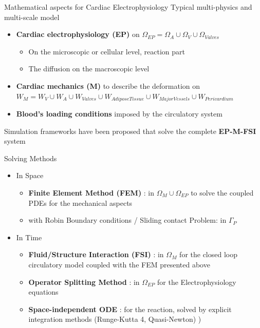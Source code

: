 \documentclass{beamer}
\begin{document}
\begin{frame}{Mathematical aspects for Cardiac Electrophysiology \cite{gerach2021electro}}
  Typical multi-physics and multi-scale model 
  \begin{itemize}
    \item \textbf{Cardiac electrophysiology (EP)} on $\Omega_{EP} = \Omega_A \cup \Omega_V \cup \Omega_{Valves}$
    \begin{itemize}
      \item On the microscopic or cellular level, reaction part
      \item The diffusion on the macroscopic level
    \end{itemize}
    \item \textbf{Cardiac mechanics (M)} to describe the deformation on $W_M = W_V \cup W_A \cup W_{Valves} \cup W_{AdiposeTissue} \cup W_{MajorVessels} \cup W_{Pericardium}$
    \item \textbf{Blood's loading conditions} imposed by the circulatory system
  \end{itemize}
  Simulation frameworks have been proposed that solve the complete \textbf{EP-M-FSI} system
\end{frame}

\begin{frame}{Solving Methods \cite{gerach2021electro}}
  \begin{itemize}
    \item In Space
      \begin{itemize}
        \item \textbf{Finite Element Method (FEM)} : in $\Omega_{M} \cup \Omega_{EP}$ to solve the coupled PDEs for the mechanical aspects
        \item with Robin Boundary conditions / Sliding contact Problem: in $\Gamma_{P}$
      \end{itemize}
    \item In Time
      \begin{itemize}
        \item \textbf{Fluid/Structure Interaction (FSI)} : in $\Omega_{M}$ for the closed loop circulatory model coupled with the FEM presented above
        \item \textbf{Operator Splitting Method} : in $\Omega_{EP}$ for the Electrophysiology equations
        \item \textbf{Space-independent ODE} : for the reaction, solved by explicit integration methods (Runge-Kutta 4, Quasi-Newton) )
      \end{itemize}
  \end{itemize}
\end{frame}
\end{document}

